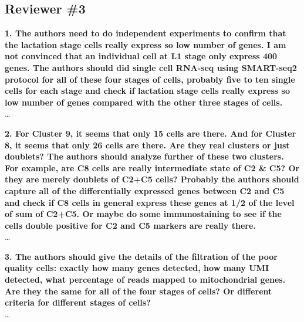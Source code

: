 \documentclass{article}
\begin{document}
\subsection*{Reviewer \#3}
\textbf{1. The authors need to do independent experiments to confirm that the lactation stage cells really express so low number of genes. I am not convinced that an individual cell at L1 stage only express 400 genes. The authors should did single cell RNA-seq using SMART-seq2 protocol for all of these four stages of cells, probably five to ten single cells for each stage and check if lactation stage cells really express so low number of genes compared with the other three stages of cells.}\\
\ldots

\textbf{2. For Cluster 9, it seems that only 15 cells are there. And for Cluster 8, it seems that only 26 cells are there. Are they real clusters or just doublets? The authors should analyze further of these two clusters. For example, are C8 cells are really intermediate state of C2 \& C5? Or they are merely doublets of C2+C5 cells? Probably the authors should capture all of the differentially expressed genes between C2 and C5 and check if C8 cells in general express these genes at 1/2 of the level of sum of C2+C5. Or maybe do some immunostaining to see if the cells double positive for C2 and C5 markers are really there.}\\
\ldots

\textbf{3. The authors should give the details of the filtration of the poor quality cells: exactly how many genes detected, how many UMI detected, what percentage of reads mapped to mitochondrial genes. Are they the same for all of the four stages of cells? Or different criteria for different stages of cells?}\\
\ldots

\printbibliography
\end{document}
